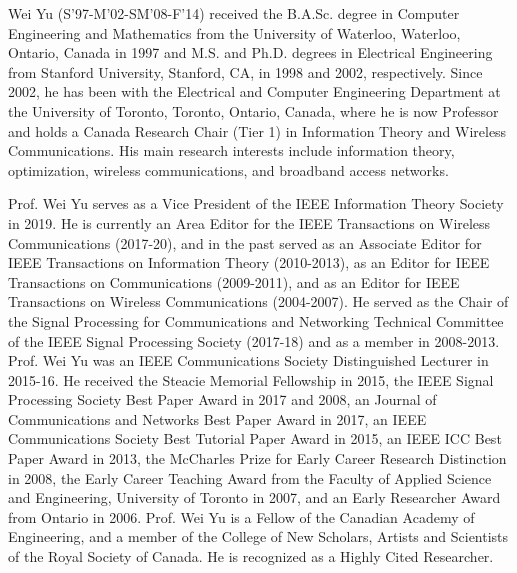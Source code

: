 \documentclass[journal,12pt,onecolumn,draftclsnofoot,]{IEEEtran}
\begin{document}
\begin{IEEEbiography}
{Wei Yu}
(S'97-M'02-SM'08-F’14) received the B.A.Sc. degree in Computer
Engineering and Mathematics from the University of Waterloo, Waterloo,
Ontario, Canada in 1997 and M.S. and Ph.D. degrees in Electrical
Engineering from Stanford University, Stanford, CA, in 1998 and 2002,
respectively. Since 2002, he has been with the Electrical and Computer
Engineering Department at the University of Toronto, Toronto, Ontario,
Canada, where he is now Professor and holds a Canada Research Chair
(Tier 1) in Information Theory and Wireless Communications. His main
research interests include information theory, optimization, wireless
communications, and broadband access networks.

Prof. Wei Yu serves as a Vice President of the IEEE Information Theory 
Society in 2019.
He is currently an Area Editor for the IEEE Transactions on Wireless 
Communications (2017-20),
and in the past served as an Associate Editor for IEEE Transactions on 
Information Theory
(2010-2013), as an Editor for IEEE Transactions on Communications
(2009-2011), and as an Editor for IEEE Transactions on Wireless
Communications (2004-2007). He served as the Chair of the Signal
Processing for Communications and Networking Technical Committee of the
IEEE Signal Processing Society (2017-18) and as a member in
2008-2013.
Prof. Wei Yu was an IEEE Communications Society Distinguished Lecturer 
in 2015-16.
He received the Steacie Memorial Fellowship in
2015, the IEEE Signal Processing Society Best Paper Award in 2017 and
2008, an Journal of Communications and Networks Best Paper Award in
2017, an IEEE Communications Society Best Tutorial Paper Award in 2015,
an IEEE ICC Best Paper Award in 2013, the McCharles Prize for Early
Career Research Distinction in 2008, the Early Career Teaching Award
from the Faculty of Applied Science and Engineering, University of
Toronto in 2007, and an Early Researcher Award from Ontario in 2006.
Prof. Wei Yu is a Fellow of the Canadian Academy of Engineering, and a
member of the College of New Scholars, Artists and Scientists of the
Royal Society of Canada. He is recognized as a Highly Cited Researcher.
\end{IEEEbiography}
\end{document}
